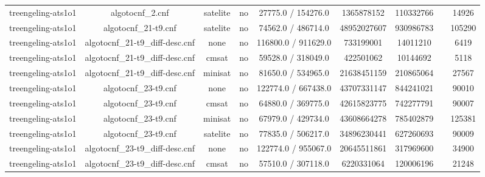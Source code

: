 \begin{appendices}
\begin{table}[p]
\begin{center}
\begin{tabular}{l|cccccccc}
  treengeling-ats1o1             & algotocnf\_2.cnf               & satelite   & no    & 27775.0 / 154276.0 & 1365878152 & 110332766 &            & 14926 \\ %
  treengeling-ats1o1             & algotocnf\_21-t9.cnf           & satelite   & no    & 74562.0 / 486714.0 & 48952027607 & 930986783 &            & 105290 \\ %
  treengeling-ats1o1             & algotocnf\_21-t9\_diff-desc.cnf & none       & no    & 116800.0 / 911629.0 & 733199001 & 14011210  &            & 6419 \\ %
  treengeling-ats1o1             & algotocnf\_21-t9\_diff-desc.cnf & cmsat      & no    & 59528.0 / 318049.0 & 422501062 & 10144692  &            & 5118 \\ %
  treengeling-ats1o1             & algotocnf\_21-t9\_diff-desc.cnf & minisat    & no    & 81650.0 / 534965.0 & 21638451159 & 210865064 &            & 27567 \\ %
  treengeling-ats1o1             & algotocnf\_23-t9.cnf           & none       & no    & 122774.0 / 667438.0 & 43707331147 & 844241021 &            & 90010 \\ %
  treengeling-ats1o1             & algotocnf\_23-t9.cnf           & cmsat      & no    & 64880.0 / 369775.0 & 42615823775 & 742277791 &            & 90007 \\ %
  treengeling-ats1o1             & algotocnf\_23-t9.cnf           & minisat    & no    & 67979.0 / 429734.0 & 43608664278 & 785402879 &            & 125381 \\ %
  treengeling-ats1o1             & algotocnf\_23-t9.cnf           & satelite   & no    & 77835.0 / 506217.0 & 34896230441 & 627260693 &            & 90009 \\ %
  treengeling-ats1o1             & algotocnf\_23-t9\_diff-desc.cnf & none       & no    & 122774.0 / 955067.0 & 20645511861 & 317969600 &            & 34900 \\ %
  treengeling-ats1o1             & algotocnf\_23-t9\_diff-desc.cnf & cmsat      & no    & 57510.0 / 307118.0 & 6220331064 & 120006196 &            & 21248 \\ %

\end{tabular}
\end{center}
\end{table}
\end{appendices}
